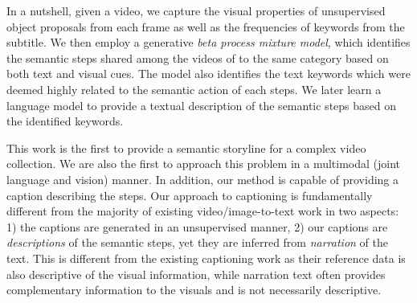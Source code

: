In a nutshell, given a video, we capture the visual properties of unsupervised object proposals from each frame as well as the frequencies of keywords from the subtitle. We then employ a generative \emph{beta process mixture model}, which identifies the semantic steps shared among the videos of to the same category based on both text and visual cues. The model also identifies the text keywords which were deemed highly related to the semantic action of each steps. We later learn a language model to provide a textual description of the semantic steps based on the identified keywords.

This work is the first to provide a semantic storyline for a complex video collection. We are also the first to approach this problem in a multimodal (joint language and vision) manner. In addition, our method is capable of providing a caption describing the steps. Our approach to captioning is fundamentally different from the majority of existing video/image-to-text work in two aspects: 1) the captions are generated in an unsupervised manner, 2) our captions are \emph{descriptions} of the semantic steps, yet they are inferred from \emph{narration} of the text. This is different from the existing captioning work as their reference data is also descriptive of the visual information, while narration text often provides complementary information to the visuals and is not necessarily descriptive.


